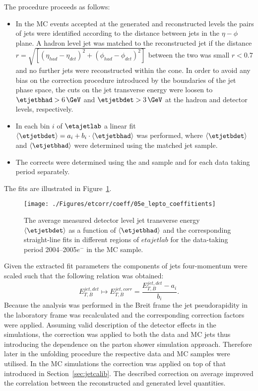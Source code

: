 The procedure proceeds as follows:
\begin{itemize}
 \item In the MC events accepted at the generated and reconstructed levels the pairs of jets were identified according to the distance between jets in the $\eta-\phi$ plane. A hadron level jet was matched to the reconstructed jet if the distance $r=\sqrt{\left[\left(\eta_{had}-\eta_{det}\right)^2 + \left(\phi_{had}-\phi_{det}\right)^2\right]}$ between the two was small $r<0.7$ and no further jets were reconstructed within the cone. In order to avoid any bias on the correction procedure introduced by the boundaries of the jet phase space, the cuts on the jet transverse energy were loosen to $\etjetbhad>6\,\GeV$ and $\etjetbdet>3\,\GeV$ at the hadron and detector levels, respectively.
 \item In each bin $i$ of $\etajetlab$ a linear fit $\left\langle\etjetbdet\right\rangle = a_i + b_i\cdot\left\langle\etjetbhad\right\rangle$ was performed, where $\left\langle\etjetbdet\right\rangle$ and $\left\langle\etjetbhad\right\rangle$ were determined using the matched jet sample.
 \item The corrects were determined using the \ariadne and \lepto sample and for each data taking period separately. 
\end{itemize}
The fits are illustrated in Figure~\ref{fig:05e_lepto_coeffitients}.
\begin{figure}[p]
\centering
\texttt{[image: ./Figures/etcorr/coeff/05e\_lepto\_coeffitients]}
\caption{The average measured detector level jet transverse energy $\left\langle\etjetbdet\right\rangle$ as a function of $\left\langle\etjetbhad\right\rangle$ and the corresponding straight-line fits in different regions of $etajetlab$ for the data-taking period 2004--2005$e^-$ in the \lepto MC sample.}
\label{fig:05e_lepto_coeffitients}
\end{figure}

Given the extracted fit parameters the components of jets four-momentum were scaled such that the following relation was obtained:
 \begin{equation}
  E_{T,B}^{jet,det} \mapsto E_{T,B}^{jet,corr} = \frac{E_{T,B}^{jet,det} - a_i}{b_i}.
 \end{equation}
Because the analysis was performed in the Breit frame the jet pseudorapidity in the laboratory frame was recalculated and the corresponding correction factors were applied. Assuming valid description of the detector effects in the simulations, the correction was applied to both the data and MC jets thus introducing the dependence on the parton shower simulation approach. Therefore later in the unfolding procedure the respective data and MC samples were utilised. In the MC simulations the correction was applied on top of that introduced in Section~\ref{sec:jetcalib}. The described correction on average improved the correlation between the reconstructed and generated level quantities.
